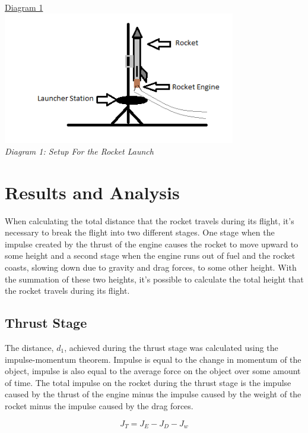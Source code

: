 \documentclass[aps,letterpaper,11pt]{revtex4}
\begin{document}
\begin{center}
\underline{Diagram 1}\\
\includegraphics[width = 4in]{Setup.png}\\
\textit{Diagram 1: Setup For the Rocket Launch}\\
\end{center}

\section{Results and Analysis}

When calculating the total distance that the rocket travels during its flight, it's necessary to break the flight into two different stages. One stage when the impulse created by the thrust of the engine causes the rocket to move upward to some height and a second stage when the engine runs out of fuel and the rocket coasts, slowing down due to gravity and drag forces, to some other height. With the summation of these two heights, it's possible to calculate the total height that the rocket travels during its flight. 

\subsection{Thrust Stage}

The distance, $d_1$, achieved during the thrust stage was calculated using the impulse-momentum theorem. Impulse is equal to the change in momentum of the object, impulse is also equal to the average force on the object over some amount of time. The total impulse on the rocket during the thrust stage is the impulse caused by the thrust of the engine minus the impulse caused by the weight of the rocket minus the impulse caused by the drag forces. 

$$ J_T = J_E - J_D - J_w$$
\end{document}
